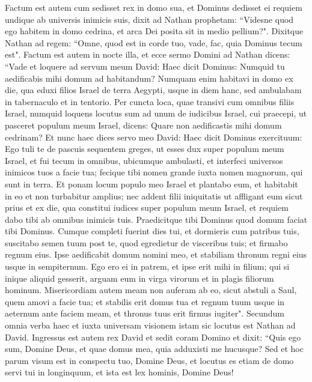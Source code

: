 \begin{biblechapter}  
\verse Factum est autem cum sedisset rex in domo sua, et Dominus dedisset ei requiem undique ab universis inimicis suis, 
\verse dixit ad Nathan prophetam: “Videsne quod ego habitem in domo cedrina, et arca Dei posita sit in medio pellium?". 
\verse Dixitque Nathan ad regem: “Omne, quod est in corde tuo, vade, fac, quia Dominus tecum est". 
\verse Factum est autem in nocte illa, et ecce sermo Domini ad Nathan dicens: 
\verse “Vade et loquere ad servum meum David: Haec dicit Dominus: Numquid tu aedificabis mihi domum ad habitandum? 
\verse Numquam enim habitavi in domo ex die, qua eduxi filios Israel de terra Aegypti, usque in diem hanc, sed ambulabam in tabernaculo et in tentorio. 
\verse Per cuncta loca, quae transivi cum omnibus filiis Israel, numquid loquens locutus sum ad unum de iudicibus Israel, cui praecepi, ut pasceret populum meum Israel, dicens: Quare non aedificastis mihi domum cedrinam? 
\verse Et nunc haec dices servo meo David: Haec dicit Dominus exercituum: Ego tuli te de pascuis sequentem greges, ut esses dux super populum meum Israel, 
\verse et fui tecum in omnibus, ubicumque ambulasti, et interfeci universos inimicos tuos a facie tua; fecique tibi nomen grande iuxta nomen magnorum, qui sunt in terra. 
\verse Et ponam locum populo meo Israel et plantabo eum, et habitabit in eo et non turbabitur amplius; nec addent filii iniquitatis ut affligant eum sicut prius 
\verse et ex die, qua constitui iudices super populum meum Israel, et requiem dabo tibi ab omnibus inimicis tuis. Praedicitque tibi Dominus quod domum faciat tibi Dominus. 
\verse Cumque completi fuerint dies tui, et dormieris cum patribus tuis, suscitabo semen tuum post te, quod egredietur de visceribus tuis; et firmabo regnum eius. 
\verse Ipse aedificabit domum nomini meo, et stabiliam thronum regni eius usque in sempiternum. 
\verse Ego ero ei in patrem, et ipse erit mihi in filium; qui si inique aliquid gesserit, arguam eum in virga virorum et in plagis filiorum hominum. 
\verse Misericordiam autem meam non auferam ab eo, sicut abstuli a Saul, quem amovi a facie tua; 
\verse et stabilis erit domus tua et regnum tuum usque in aeternum ante faciem meam, et thronus tuus erit firmus iugiter". 
\verse Secundum omnia verba haec et iuxta universam visionem istam sic locutus est Nathan ad David. 
\verse Ingressus est autem rex David et sedit coram Domino et dixit: “Quis ego sum, Domine Deus, et quae domus mea, quia adduxisti me hucusque? 
\verse Sed et hoc parum visum est in conspectu tuo, Domine Deus, et locutus es etiam de domo servi tui in longinquum, et ista est lex hominis, Domine Deus! 

\end{biblechapter}
